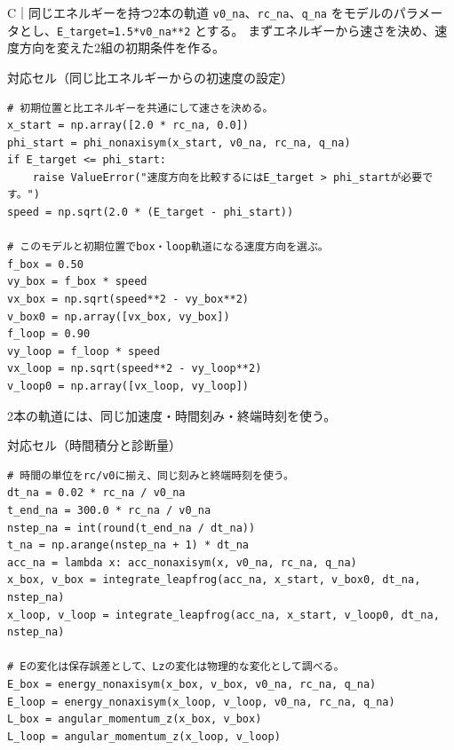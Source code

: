 \begin{notebookblock}{C｜同じエネルギーを持つ2本の軌道}
\texttt{v0\_na}、\texttt{rc\_na}、\texttt{q\_na} をモデルのパラメータとし、\texttt{E\_target=1.5*v0\_na**2} とする。
まずエネルギーから速さを決め、速度方向を変えた2組の初期条件を作る。
\par\smallskip\noindent\begin{minipage}{\linewidth}
{\sffamily\small\color{graytext}対応セル（同じ比エネルギーからの初速度の設定）}
\begin{Verbatim}[fontsize=\footnotesize,xleftmargin=2mm,frame=single,framesep=1.8mm,framerule=0.35pt,rulecolor=\color{listingframe},fillcolor=\color{listingbg}]
# 初期位置と比エネルギーを共通にして速さを決める。
x_start = np.array([2.0 * rc_na, 0.0])
phi_start = phi_nonaxisym(x_start, v0_na, rc_na, q_na)
if E_target <= phi_start:
    raise ValueError("速度方向を比較するにはE_target > phi_startが必要です。")
speed = np.sqrt(2.0 * (E_target - phi_start))

# このモデルと初期位置でbox・loop軌道になる速度方向を選ぶ。
f_box = 0.50
vy_box = f_box * speed
vx_box = np.sqrt(speed**2 - vy_box**2)
v_box0 = np.array([vx_box, vy_box])
f_loop = 0.90
vy_loop = f_loop * speed
vx_loop = np.sqrt(speed**2 - vy_loop**2)
v_loop0 = np.array([vx_loop, vy_loop])
\end{Verbatim}
\end{minipage}

2本の軌道には、同じ加速度・時間刻み・終端時刻を使う。
\par\smallskip\noindent\begin{minipage}{\linewidth}
{\sffamily\small\color{graytext}対応セル（時間積分と診断量）}
\begin{Verbatim}[fontsize=\footnotesize,xleftmargin=2mm,frame=single,framesep=1.8mm,framerule=0.35pt,rulecolor=\color{listingframe},fillcolor=\color{listingbg}]
# 時間の単位をrc/v0に揃え、同じ刻みと終端時刻を使う。
dt_na = 0.02 * rc_na / v0_na
t_end_na = 300.0 * rc_na / v0_na
nstep_na = int(round(t_end_na / dt_na))
t_na = np.arange(nstep_na + 1) * dt_na
acc_na = lambda x: acc_nonaxisym(x, v0_na, rc_na, q_na)
x_box, v_box = integrate_leapfrog(acc_na, x_start, v_box0, dt_na, nstep_na)
x_loop, v_loop = integrate_leapfrog(acc_na, x_start, v_loop0, dt_na, nstep_na)

# Eの変化は保存誤差として、Lzの変化は物理的な変化として調べる。
E_box = energy_nonaxisym(x_box, v_box, v0_na, rc_na, q_na)
E_loop = energy_nonaxisym(x_loop, v_loop, v0_na, rc_na, q_na)
L_box = angular_momentum_z(x_box, v_box)
L_loop = angular_momentum_z(x_loop, v_loop)
\end{Verbatim}
\end{minipage}

\end{notebookblock}

